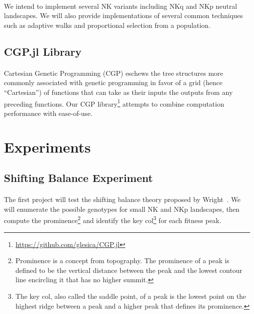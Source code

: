 \documentclass[12pt,letterpaper,titlepage,draft]{article}
\begin{document}
\paragraph{}
We intend to implement several NK variants including NKq and NKp neutral
landscapes. We will also provide implementations of several common techniques
such as adaptive walks and proportional selection from a population.

\subsection{CGP.jl Library}

\paragraph{}
Cartesian Genetic Programming (CGP) eschews the tree structures more commonly
associated with genetic programming in favor of a grid (hence ``Cartesian'') of
functions that can take as their inputs the outputs from any preceding
functions. Our CGP library\footnote{\url{https://github.com/glesica/CGP.jl}}
attempts to combine computation performance with ease-of-use.

\section{Experiments}

\subsection{Shifting Balance Experiment}

\paragraph{}
The first project will test the shifting balance theory proposed by
Wright~\cite{Wright1982}\cite{Wright1931}. We will enumerate the possible
genotypes for small NK and NKp landscapes, then compute the
prominence\footnote{Prominence is a concept from topography. The prominence of
a peak is defined to be the vertical distance between the peak and the
lowest contour line encircling it that has no higher summit.} and identify the
key col\footnote{The key col, also called the saddle point, of a peak is the
lowest point on the highest ridge between a peak and a higher peak that
defines its prominence.} for each fitness peak.
\end{document}
